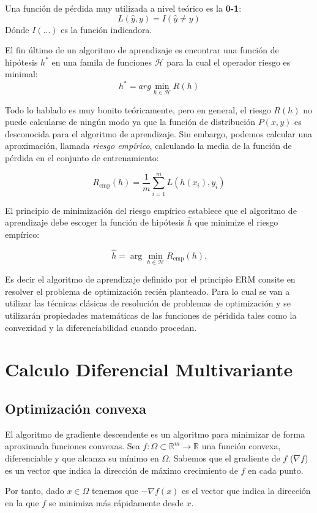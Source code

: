 Una función de pérdida muy utilizada a nivel teórico es la \textbf{0-1}:  
$$L({\hat {y}},y)=I({\hat {y}}\neq y)$$
Dónde $I(...)$ es la función indicadora.

El fin último de un algoritmo de aprendizaje es encontrar una función de hipótesis $h^*$ en una famila de funciones $\mathcal{H}$ para la cual el operador riesgo es minimal:  
$$ h^* = arg \min_{h\in\mathcal{H}} R(h) $$

Todo lo hablado es muy bonito teóricamente, pero en general, el riesgo $R(h)$ no puede calcularse de ningún modo ya que la función de distribución $P(x,y)$ es desconocida para el algoritmo de aprendizaje. Sin embargo, podemos calcular una aproximación, llamada \textit{riesgo empírico}, calculando la media de la función de pérdida en el conjunto de entrenamiento:  

$$ R_{\text{emp}}(h) = \frac{1}{m}\sum_{i=1}^m L(h(x_i), y_i) $$

El principio de minimización del riesgo empírico establece que el algoritmo de aprendizaje debe escoger la función de hipótesis $\hat{h}$ que minimize el riesgo empírico:

$$\hat{h}=\arg \min_{h\in {\mathcal {H}}}R_{\text{emp}}(h).$$

Es decir el algoritmo de aprendizaje definido por el principio ERM consite en resolver el problema de optimización recién planteado. Para lo cual se van a utilizar las técnicas clásicas de resolución de problemas de optimización y se utilizarán propiedades matemáticas de las funciones de péridida tales como la convexidad y la diferenciabilidad cuando procedan.

\section{Calculo Diferencial Multivariante}

\subsection{Optimización convexa}

El algoritmo de gradiente descendente es un algoritmo para minimizar de forma aproximada funciones convexas. 
Sea $f : \Omega \subset \mathbb{R}^m \rightarrow \mathbb{R}$ una función convexa, diferenciable y que alcanza su mínimo en $\Omega$.  
Sabemos que el gradiente de $f$ ($\nabla f$) es un vector que indica la dirección de máximo crecimiento de $f$ en cada punto.  

Por tanto, dado $x \in \Omega$ tenemos que $-\nabla f(x)$ es el vector que indica la dirección en la que $f$ se minimiza más rápidamente desde $x$.

